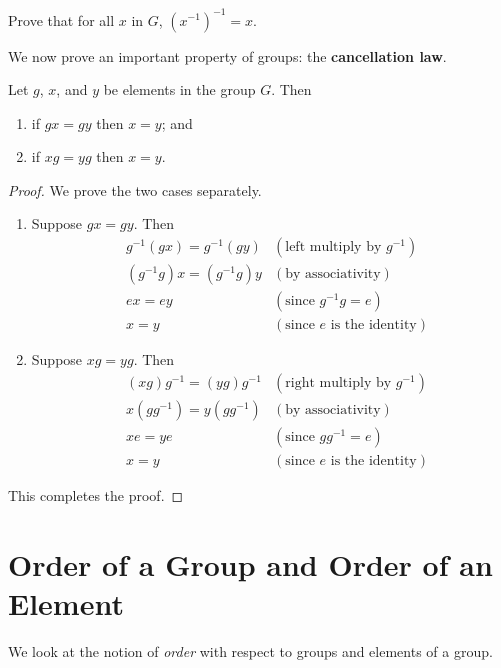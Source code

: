 \begin{exercise}
Prove that for all $x$ in $G$, $\left(x^{-1}\right)^{-1} = x$.
\end{exercise}

We now prove an important property of groups: the \textbf{cancellation law}.
\begin{proposition}
    Let $g$, $x$, and $y$ be elements in the group $G$. Then
    \begin{enumerate}
        \item if $gx=gy$ then $x = y$; and
        \item if $xg=yg$ then $x = y$.
    \end{enumerate}
\end{proposition}
\begin{proof}
    We prove the two cases separately.
    \begin{enumerate}
        \item Suppose $gx = gy$. Then
        \begin{align*}
            &g^{-1}(gx) = g^{-1}(gy) & (\text{left multiply by } g^{-1})\\
            &(g^{-1}g)x = (g^{-1}g)y & (\text{by associativity})\\
            &ex = ey & (\text{since } g^{-1}g = e)\\
            &x = y & (\text{since } e \text{ is the identity})
        \end{align*}
        \item Suppose $xg = yg$. Then
        \begin{align*}
            &(xg)g^{-1} = (yg)g^{-1} & (\text{right multiply by } g^{-1})\\
            &x(gg^{-1}) = y(gg^{-1}) & (\text{by associativity})\\
            &xe = ye & (\text{since } gg^{-1} = e)\\
            &x = y & (\text{since } e \text{ is the identity})
        \end{align*}
    \end{enumerate}
    This completes the proof.
\end{proof}

\section{Order of a Group and Order of an Element}
We look at the notion of \textit{order} with respect to groups and elements of a group.

